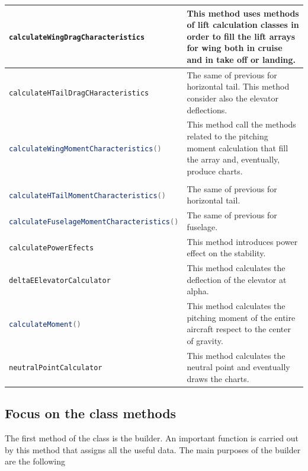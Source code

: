 \begin{longtable} {lp{}}
		\lstinline[language=Java]!calculateWingDragCharacteristics! & This method uses methods of lift calculation classes in order to fill the lift arrays for wing both in cruise and in take off or landing.\\\hline 
		\lstinline[language=Java]!calculateHTailDragCHaracteristics! & The same of previous for horizontal tail. This method consider also the elevator deflections.\\\hline 
		\lstinline[language=Java]!calculateWingMomentCharacteristics()!& This method call the methods related to the pitching moment calculation that fill the array and, eventually, produce charts.\\ \hline \\
		\lstinline[language=Java]!calculateHTailMomentCharacteristics()!& The same of previous for horizontal tail.\\ \hline 
		\lstinline[language=Java]!calculateFuselageMomentCharacteristics()!& The same of previous for fuselage.\\ \hline 
		\lstinline[language=Java]!calculatePowerEfects!& This method introduces power effect on the stability.\\ \hline
		\lstinline[language=Java]!deltaEElevatorCalculator!& This method calculates the deflection of the elevator at alpha.\\ \hline 
		\lstinline[language=Java]!calculateMoment()!& This method calculates the pitching moment of the entire aircraft respect to the center of gravity.\\ \hline 
		\lstinline[language=Java]!neutralPointCalculator!& This method calculates the neutral point and eventually draws the charts.\\ \hline 
		\bottomrule
	\end{longtable}

\subsection{Focus on the class methods}
The first method of the class is the builder. An important function is carried out by this method that assigns all the useful data. The main purposes of the builder are the following

